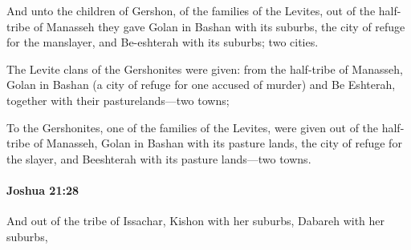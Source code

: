 			\begin{versebox}
					\item[BHS] 
					\item[ASV] And unto the children of Gershon, of the families of the Levites, out of the half-tribe of Manasseh they gave Golan in Bashan with its suburbs, the city of refuge for the manslayer, and Be-eshterah with its suburbs; two cities.
					\item[NIV] The Levite clans of the Gershonites were given: from the half-tribe of Manasseh, Golan in Bashan (a city of refuge for one accused of murder) and Be Eshterah, together with their pasturelands—two towns;
					\item[NRSV] To the Gershonites, one of the families of the Levites, were given out of the half-tribe of Manasseh, Golan in Bashan with its pasture lands, the city of refuge for the slayer, and Beeshterah with its pasture lands—two towns.
			\end{versebox}

		\paragraph{Joshua 21:28} %
			\label{JOSHUA-21-28}

			And out of the tribe of Issachar, Kishon with her suburbs, Dabareh with her suburbs,

